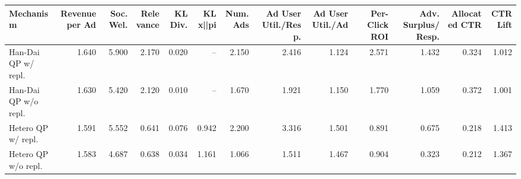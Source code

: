 \begin{tabular}{lrrrrrrrrrrrr}
\hline
Mechanism & Revenue per Ad & Soc. Wel. & Relevance & KL Div. & KL x||pi & Num. Ads & Ad User Util./Resp. & Ad User Util./Ad & Per-Click ROI & Adv. Surplus/Resp. & Allocated CTR & CTR Lift \\
\hline
Han-Dai QP w/ repl. & 1.640 & 5.900 & 2.170 & 0.020 & -- & 2.150 & 2.416 & 1.124 & 2.571 & 1.432 & 0.324 & 1.012 \\
Han-Dai QP w/o repl. & 1.630 & 5.420 & 2.120 & 0.010 & -- & 1.670 & 1.921 & 1.150 & 1.770 & 1.059 & 0.372 & 1.001 \\
Hetero QP w/ repl. & 1.591 & 5.552 & 0.641 & 0.076 & 0.942 & 2.200 & 3.316 & 1.501 & 0.891 & 0.675 & 0.218 & 1.413 \\
Hetero QP w/o repl. & 1.583 & 4.687 & 0.638 & 0.034 & 1.161 & 1.066 & 1.511 & 1.467 & 0.904 & 0.323 & 0.212 & 1.367 \\
\hline
\end{tabular}
